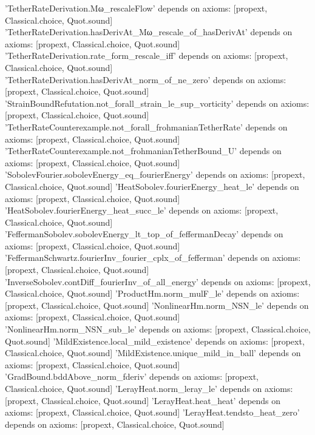 \documentclass[11pt,a4paper]{article}
\theoremstyle{definition}
\theoremstyle{remark}
\begin{document}
\begin{leancode}
'TetherRateDerivation.Mω_rescaleFlow' depends on axioms: [propext, Classical.choice, Quot.sound]
'TetherRateDerivation.hasDerivAt_Mω_rescale_of_hasDerivAt' depends on axioms: [propext, Classical.choice, Quot.sound]
'TetherRateDerivation.rate_form_rescale_iff' depends on axioms: [propext, Classical.choice, Quot.sound]
'TetherRateDerivation.hasDerivAt_norm_of_ne_zero' depends on axioms: [propext, Classical.choice, Quot.sound]
'StrainBoundRefutation.not_forall_strain_le_sup_vorticity' depends on axioms: [propext, Classical.choice, Quot.sound]
'TetherRateCounterexample.not_forall_frohmanianTetherRate' depends on axioms: [propext, Classical.choice, Quot.sound]
'TetherRateCounterexample.not_frohmanianTetherBound_U' depends on axioms: [propext, Classical.choice, Quot.sound]
'SobolevFourier.sobolevEnergy_eq_fourierEnergy' depends on axioms: [propext, Classical.choice, Quot.sound]
'HeatSobolev.fourierEnergy_heat_le' depends on axioms: [propext, Classical.choice, Quot.sound]
'HeatSobolev.fourierEnergy_heat_succ_le' depends on axioms: [propext, Classical.choice, Quot.sound]
'FeffermanSobolev.sobolevEnergy_lt_top_of_feffermanDecay' depends on axioms: [propext, Classical.choice, Quot.sound]
'FeffermanSchwartz.fourierInv_fourier_cplx_of_fefferman' depends on axioms: [propext, Classical.choice, Quot.sound]
'InverseSobolev.contDiff_fourierInv_of_all_energy' depends on axioms: [propext, Classical.choice, Quot.sound]
'ProductHm.norm_mulF_le' depends on axioms: [propext, Classical.choice, Quot.sound]
'NonlinearHm.norm_NSN_le' depends on axioms: [propext, Classical.choice, Quot.sound]
'NonlinearHm.norm_NSN_sub_le' depends on axioms: [propext, Classical.choice, Quot.sound]
'MildExistence.local_mild_existence' depends on axioms: [propext, Classical.choice, Quot.sound]
'MildExistence.unique_mild_in_ball' depends on axioms: [propext, Classical.choice, Quot.sound]
'GradBound.bddAbove_norm_fderiv' depends on axioms: [propext, Classical.choice, Quot.sound]
'LerayHeat.norm_leray_le' depends on axioms: [propext, Classical.choice, Quot.sound]
'LerayHeat.heat_heat' depends on axioms: [propext, Classical.choice, Quot.sound]
'LerayHeat.tendsto_heat_zero' depends on axioms: [propext, Classical.choice, Quot.sound]

\end{leancode}
\end{document}
